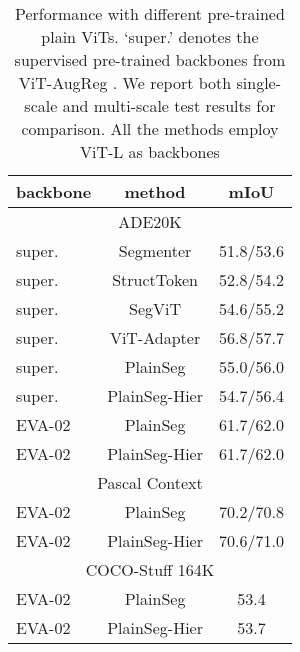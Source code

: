 \documentclass{article} \usepackage{iclr2024_conference,times}
\begin{document}
\begin{table}[h]
\begin{minipage}[c]{0.40\textwidth}
\caption{Performance with different pre-trained plain ViTs. `super.' denotes the supervised pre-trained backbones from ViT-AugReg \citep{steiner2021train}. We report both single-scale and multi-scale test results for comparison. All the methods employ ViT-L as backbones}
\begin{center}
\label{tab:6}
\begin{tabular}{lcc}
\toprule
backbone &method & mIoU \\\midrule
\multicolumn{3}{c}{ADE20K} \\ \midrule
super. &Segmenter &51.8/53.6  \\
super. &StructToken &52.8/54.2\\
super. &SegViT &54.6/55.2\\
super. &ViT-Adapter &56.8/57.7\\
super. &PlainSeg &55.0/56.0\\
super. &PlainSeg-Hier &54.7/56.4\\\midrule
EVA-02 &PlainSeg &61.7/62.0\\
EVA-02 &PlainSeg-Hier &61.7/62.0\\ \midrule\midrule
\multicolumn{3}{c}{Pascal Context} \\ \midrule
EVA-02 &PlainSeg &70.2/70.8\\
EVA-02 &PlainSeg-Hier &70.6/71.0\\ \midrule\midrule
\multicolumn{3}{c}{COCO-Stuff 164K} \\ \midrule
EVA-02 &PlainSeg &53.4\\
EVA-02 &PlainSeg-Hier &53.7\\
\bottomrule
\end{tabular}
\end{center}
\end{minipage}
\end{table}

\end{document}
